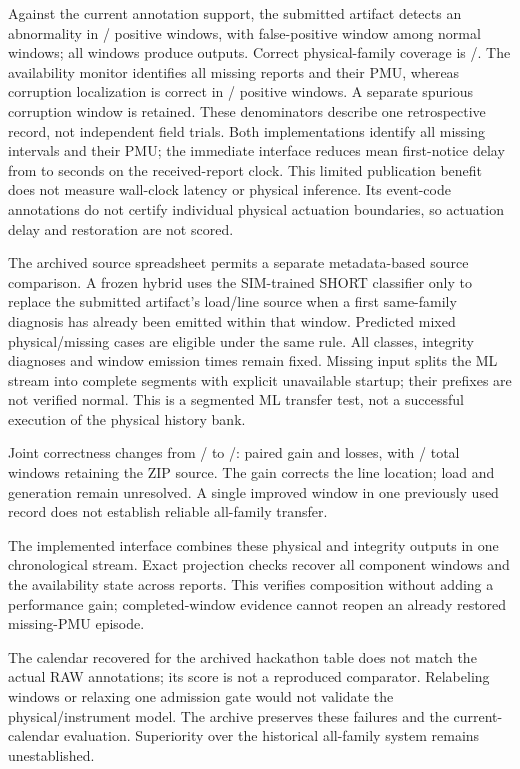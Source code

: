 Against the current annotation support, the submitted artifact detects an
abnormality in \SSRawDetected{}/\SSRawPositive{} positive windows, with
\SSRawFalse{} false-positive window among \SSRawNormal{} normal windows;
all \SSRawAvailable{} windows produce outputs. Correct physical-family
coverage is \SSRawPhysicalCorrect{}/\SSRawPhysicalTotal{}. The availability
monitor identifies all \SSMissingTotal{} missing reports and their PMU,
whereas corruption localization is correct in
\SSCorruptLocated{}/\SSCorruptTotal{} positive windows. A separate spurious
corruption window is retained. These denominators describe one retrospective
record, not independent field trials. Both implementations identify all
\MissingEpisodes{} missing intervals and their PMU; the immediate interface
reduces mean first-notice delay from \MissingLegacyDelay{} to
\MissingImmediateDelay{} seconds on the received-report clock. This limited
publication benefit does not measure wall-clock latency or physical inference.
Its event-code annotations do not certify individual physical actuation
boundaries, so actuation delay and restoration are not scored.

The archived source spreadsheet permits a separate metadata-based source
comparison. A frozen hybrid uses the SIM-trained SHORT classifier only to
replace the submitted artifact's load/line source when a first same-family
diagnosis has already been emitted within that window. Predicted mixed
physical/missing cases are eligible under the same rule. All classes,
integrity diagnoses and window emission times remain fixed. Missing input
splits the ML stream into complete segments with explicit unavailable
startup; their prefixes are not verified normal. This is a segmented ML
transfer test, not a successful execution of the physical history bank.

Joint correctness changes from \RawZIPJoint{}/\RawZIPTotal{} to
\RawHybridJoint{}/\RawHybridTotal{}: \RawHybridGains{} paired gain and
\RawHybridLosses{} losses, with \RawHybridFallbacks{}/\SSRawWindows{}
total windows retaining the ZIP source. The gain corrects the line location; load and generation
remain unresolved. A single improved window in one previously used record
does not establish reliable all-family transfer.

The implemented interface combines these physical and integrity outputs in
one chronological stream. Exact projection checks recover all
\SystemWindows{} component windows and the availability state across
\SystemReports{} reports. This verifies composition without adding a
performance gain; completed-window evidence cannot reopen an already
restored missing-PMU episode.

The calendar
recovered for the archived hackathon table does not match the actual RAW
annotations; its score is not a reproduced comparator. Relabeling windows
or relaxing one admission gate would not validate the physical/instrument
model. The archive preserves these failures and the current-calendar
evaluation. Superiority over the
historical all-family system remains unestablished.
